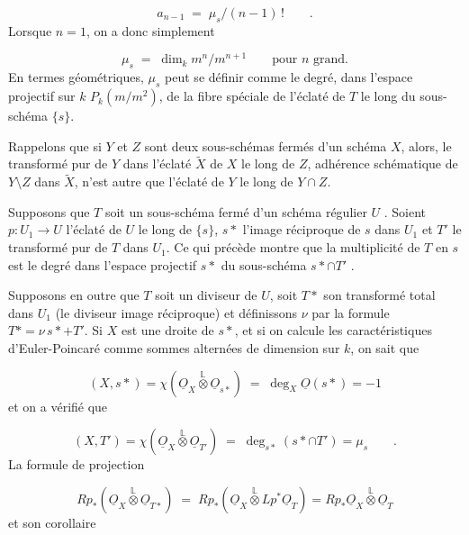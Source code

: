\begin{equation*}
a_{n-1} \;=\; \mu_s/(n-1)\, ! \qquad .
\end{equation*}
Lorsque $n = 1$, on a donc simplement

\begin{equation*}
\mu_s \;=\; \dim_k m^n/m^{n+1} \qquad \text{pour } n \text{ grand.}
\end{equation*}
En termes géométriques, $\mu_s$ peut se définir comme le degré, dans l'espace projectif sur $k$ $P_k(m/m^2)$, de la fibre spéciale de l'éclaté de $T$ le long du sous-schéma $\{s\}$.



Rappelons que si $Y$ et $Z$ sont deux sous-schémas fermés d'un schéma $X$, alors, le transformé pur de $Y$ dans l'éclaté $\tilde{X}$ de $X$ le long de $Z$, adhérence schématique de $Y \setminus Z$ dans $\tilde{X}$, n'est autre que l'éclaté de $Y$ le long de $Y \cap Z$.

Supposons que $T$ soit un sous-schéma fermé d'un schéma régulier $U$ . Soient $p : U_1 \longrightarrow U$ l'éclaté de $U$ le long de $\{s\}$, $s*$ l'image réciproque de $s$ dans $U_1$ et $T'$ le transformé pur de $T$ dans $U_1$. Ce qui précède montre que la multiplicité de $T$ en $s$ est le degré dans l'espace projectif $s*$ du sous-schéma $s* \cap T'$ .

Supposons en outre que $T$ soit un diviseur de $U$, soit $T*$ son transformé total dans $U_1$ (le diviseur image réciproque) et définissons $\nu$ par la formule $T* = \nu\, s* + T'$. Si $X$ est une droite de $s*$, et si on calcule les caractéristiques d'Euler-Poincaré comme sommes alternées de dimension sur $k$, on sait que

\begin{equation}\tag{2.6.1}
(X,s*) = \chi(\underline{O}_X \overset{\mathbb{L}}{\otimes} \underline{O}_{s*}) \;=\; \deg_X \underline{O}(s*) = -1
\end{equation}
et on a vérifié que

\begin{equation}\tag{2.6.2}
(X,T') = \chi(\underline{O}_X \overset{\mathbb{L}}{\otimes} \underline{O}_{T'}) \;=\; \deg_{s*} (s* \cap T') = \mu_s \qquad .
\end{equation}
La formule de projection

\begin{equation*}
Rp_*(\underline{O}_X \overset{\mathbb{L}}{\otimes} \underline{O}_{T*}) \;=\; Rp_*(\underline{O}_X \overset{\mathbb{L}}{\otimes} Lp^* \underline{O}_T) = Rp_* \underline{O}_X \overset{\mathbb{L}}{\otimes} \underline{O}_T
\end{equation*}
et son corollaire

